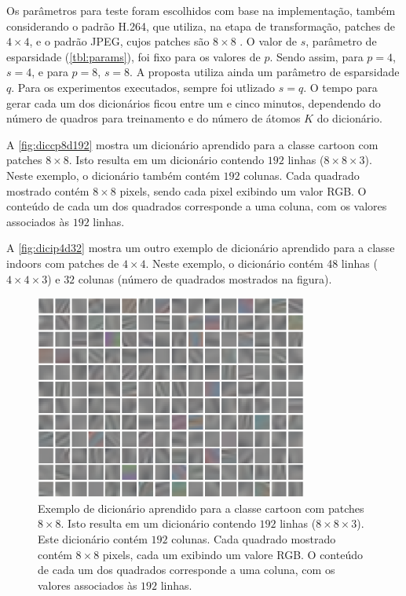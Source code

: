 \documentclass[cic,tc]{iiufrgs}
\begin{document}
Os parâmetros para teste foram escolhidos com base na implementação, também considerando 
o padrão H.264, que utiliza, na etapa de transformação, patches de $4\times4$, 
e o padrão JPEG, cujos patches são $8\times8$ \cite{mitchell1992digital}.
O valor de $s$, parâmetro de esparsidade (\autoref{tbl:params}), foi fixo para os valores de $p$. 
Sendo assim, para $p=4$, $s=4$, e para $p=8$, $s=8$.
A proposta utiliza ainda um parâmetro de esparsidade $q$. 
Para os experimentos executados, sempre foi utlizado $s = q$.
O tempo para gerar cada um dos dicionários ficou entre um e cinco minutos, dependendo do número
de quadros para treinamento e do número de átomos $K$ do dicionário.

A \autoref{fig:diccp8d192} mostra um dicionário aprendido para a classe cartoon com patches $8\times8$. 
Isto resulta em um dicionário contendo $192$ linhas ($8\times8\times3$). 
Neste exemplo, o dicionário também contém $192$ colunas. 
Cada quadrado mostrado contém $8\times8$ pixels, sendo cada pixel exibindo um valor RGB.
O conteúdo de cada um dos quadrados corresponde a uma coluna, com os valores associados às $192$ linhas. 

A \autoref{fig:dicip4d32} mostra um outro exemplo de dicionário aprendido para a classe indoors com patches de $4\times4$. 
Neste exemplo, o dicionário contém 48 linhas ($4\times4\times3$) e 
$32$ colunas (número de quadrados mostrados na figura).

\begin{figure}[H]
    \caption{Exemplo de dicionário aprendido para a classe cartoon com patches $8\times8$. 
    Isto resulta em um dicionário contendo $192$ linhas ($8\times8\times3$). 
    Este dicionário contém $192$ colunas. 
    Cada quadrado mostrado contém $8\times8$ pixels, 
    cada um exibindo um valore RGB.
    O conteúdo de cada um dos quadrados corresponde a uma coluna, com os valores 
    associados às $192$ linhas.}
    \begin{center}
           \includegraphics[width=0.8\textwidth]{img/cartoon_p8_d192.png}
    \end{center}
    \label{fig:diccp8d192}
\end{figure}
\end{document}
